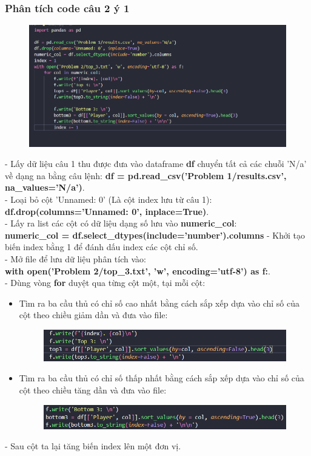 \subsubsection{Phân tích code câu 2 ý 1}
    \begin{figure}[H]
        \centering
        \includegraphics[width=1\linewidth]{img/2_1.png}
    \end{figure}
    - Lấy dữ liệu câu 1 thu được đưa vào dataframe \textbf{df} chuyển tất cả các chuỗi 'N/a' về dạng na bằng câu lệnh: \textbf{df = pd.read\_csv('Problem 1/results.csv', na\_values='N/a')}.\\
    - Loại bỏ cột 'Unnamed: 0' (Là cột index lưu từ câu 1): \textbf{df.drop(columns='Unnamed: 0', inplace=True)}.\\
    - Lấy ra list các cột có dữ liệu dạng số lưu vào \textbf{numeric\_col}: \\ \textbf{numeric\_col = df.select\_dtypes(include='number').columns}
    - Khởi tạo biến index bằng 1 để đánh dấu index các cột chỉ số.\\
    - Mở file để lưu dữ liệu phân tích vào:\\ \textbf{with open('Problem 2/top\_3.txt', 'w', encoding='utf-8') as f:}. \\
    - Dùng vòng \textbf{for} duyệt qua từng cột một, tại mỗi cột:
    \begin{itemize}
        \item Tìm ra ba cầu thủ có chỉ số cao nhất bằng cách sắp xếp dựa vào chỉ số của cột theo chiều giảm dần và đưa vào file:
        \begin{figure}[H]
            \centering
            \includegraphics[width=1\linewidth]{img/top3.png}
        \end{figure}
        \item Tìm ra ba cầu thủ có chỉ số thấp nhất bằng cách sắp xếp dựa vào chỉ số của cột theo chiều tăng dần và đưa vào file:
        \begin{figure}[H]
            \centering
            \includegraphics[width=1\linewidth]{img/bottom3.png}
        \end{figure}
    \end{itemize}
    - Sau cột ta lại tăng biến index lên một đơn vị.\\

